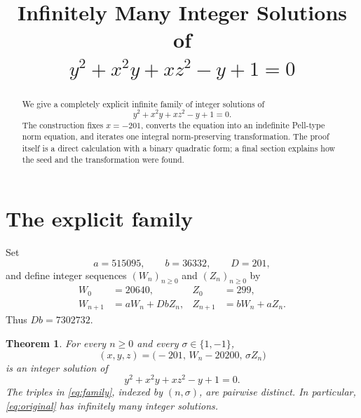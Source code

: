 \documentclass[11pt]{article}
\title{Infinitely Many Integer Solutions of\\[-1mm]
\texorpdfstring{$y^2+x^2y+xz^2-y+1=0$}{y2+x2y+xz2-y+1=0}}
\author{}
\date{}
\newtheorem{theorem}{Theorem}
\theoremstyle{remark}
\begin{document}
\maketitle
\vspace{-2.2em}

\begin{abstract}
We give a completely explicit infinite family of integer solutions of
\[
 y^2+x^2y+xz^2-y+1=0.
\]
The construction fixes $x=-201$, converts the equation into an indefinite Pell-type norm equation, and iterates one integral norm-preserving transformation.  The proof itself is a direct calculation with a binary quadratic form; a final section explains how the seed and the transformation were found.
\end{abstract}

\section{The explicit family}

Set
\[
 a=515095,\qquad b=36332,\qquad D=201,
\]
and define integer sequences $(W_n)_{n\geq 0}$ and $(Z_n)_{n\geq 0}$ by
\begin{equation}\label{eq:recurrence}
 \begin{aligned}
 W_0&=20640, & Z_0&=299,\\
 W_{n+1}&=aW_n+DbZ_n,
 &Z_{n+1}&=bW_n+aZ_n.
 \end{aligned}
\end{equation}
Thus $Db=7302732$.

\begin{theorem}\label{thm:main}
For every $n\geq 0$ and every $\sigma\in\{1,-1\}$,
\begin{equation}\label{eq:family}
 (x,y,z)=\bigl(-201,\,W_n-20200,\,\sigma Z_n\bigr)
\end{equation}
is an integer solution of
\begin{equation}\label{eq:original}
 y^2+x^2y+xz^2-y+1=0.
\end{equation}
The triples in \eqref{eq:family}, indexed by $(n,\sigma)$, are pairwise distinct.  In particular, \eqref{eq:original} has infinitely many integer solutions.
\end{theorem}
\end{document}
